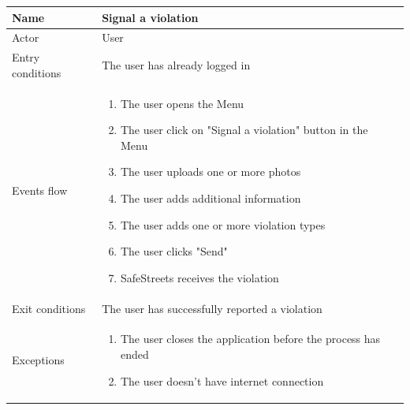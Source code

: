 \documentclass{article}
\begin{document}
\begin{table}[H]
    \begin{tabular}{|l|l|}
    \hline
    Name & \begin{minipage}[t]{0.7\textwidth} \textbf{Signal a violation}\end{minipage}
    \\ \hline  
    Actor & \begin{minipage}[t]{0.7\textwidth} User\end{minipage} \\ \hline 
    Entry conditions & \begin{minipage}[t]{0.7\textwidth} The user has already
    logged in \end{minipage} \\ \hline 
    Events flow & \begin{minipage}[t]{0.7\textwidth}
    \begin{enumerate}
        \item The user opens the Menu
        \item The user click on "Signal a violation" button in the Menu
        \item The user uploads one or more photos
        \item The user adds additional information
        \item The user adds one or more violation types
        \item The user clicks "Send"
        \item SafeStreets receives the violation
    \end{enumerate}
    \end{minipage} \\ \hline
    Exit conditions & \begin{minipage}[t]{0.7\textwidth}The user has
    successfully reported a violation \end{minipage} \\ \hline
    Exceptions & \begin{minipage}[t]{0.7\textwidth}
    \begin{enumerate}
        \item The user closes the application before the process has ended 
        \item The user doesn't have internet connection 
    \end{enumerate}    
    \end{minipage} \\ \hline
    \end{tabular}
\end{table}
\end{document}
